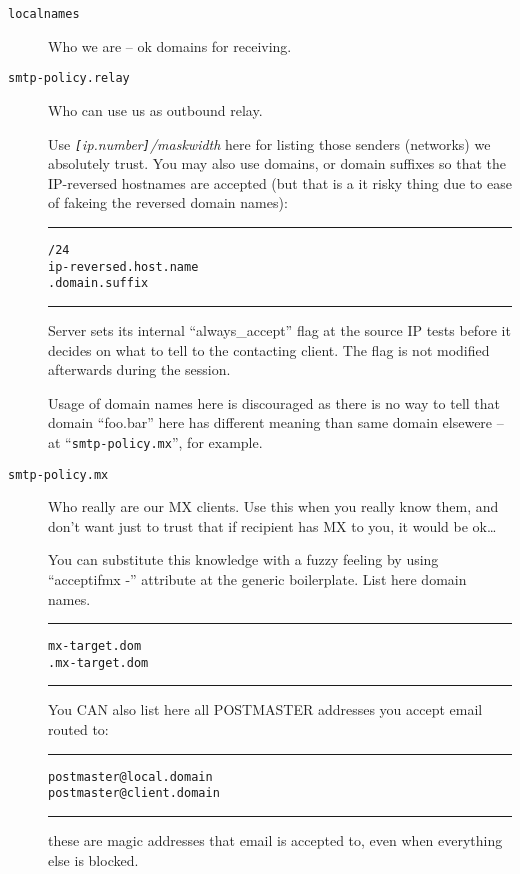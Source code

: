 \begin{description}
\item[\tt localnames] \mbox{}

Who we are -- ok domains for receiving.

\item[\tt smtp-policy.relay] \mbox{}

Who can use us as outbound relay.

Use  {\em\verb/[/ip.number\verb/]//maskwidth}  here for
listing those senders (networks) we absolutely trust.
You may also use domains, or domain suffixes so that the IP-reversed
hostnames are accepted (but that is a it risky thing due to ease of
fakeing the reversed domain names):

\begin{alltt}\medskip\hrule\medskip
[11.22.33.00]/24
ip-reversed.host.name
.domain.suffix
\medskip\hrule\end{alltt}\medskip

Server sets its internal ``always\_accept'' flag at the source IP tests
before it decides on what to tell to the contacting client.
The flag is not modified afterwards during the session.

Usage of domain names here is discouraged as there is no way to tell
that domain ``foo.bar'' here has different meaning than same domain
elsewere -- at ``{\tt smtp-policy.mx}'', for example.

\item[\tt smtp-policy.mx] \mbox{}

Who really are our MX clients.
Use this when you really know them, and don't want just to trust
that if recipient has MX to you, it would be ok\ldots

You can substitute this knowledge with a fuzzy feeling by using
``acceptifmx -'' attribute at the generic boilerplate.
List here domain names. 
\begin{alltt}\medskip\hrule\medskip
 mx-target.dom
 .mx-target.dom
\medskip\hrule\end{alltt}\medskip

You CAN also list here all POSTMASTER addresses you accept email routed to: 

\begin{alltt}\medskip\hrule\medskip
 postmaster@local.domain
 postmaster@client.domain
\medskip\hrule\end{alltt}\medskip

these are magic addresses that email is accepted to, even when everything
else is blocked. 


\end{description}
